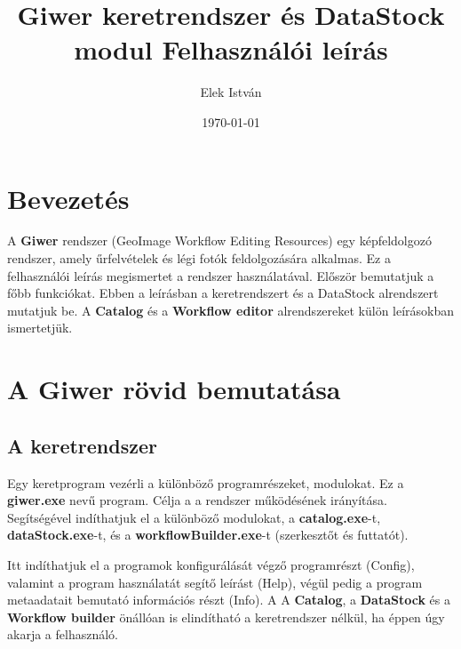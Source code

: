 \documentclass[a4paper,12pt]{article}
\begin{document}
\author{Elek István}

\title{ Giwer keretrendszer és DataStock modul  \linebreak  \linebreak \small Felhasználói leírás \linebreak \linebreak}


\date{\today}


\setcounter{tocdepth}{3}
\maketitle
\newpage
\tableofcontents
\newpage


\section{Bevezetés}

A \textbf{Giwer} rendszer (GeoImage Workflow Editing Resources) egy képfeldolgozó rendszer, amely űrfelvételek és légi fotók feldolgozására alkalmas. Ez a felhasználói leírás megismertet a rendszer használatával. Először bemutatjuk a főbb funkciókat. Ebben a leírásban a keretrendszert és a DataStock alrendszert mutatjuk be. A \textbf{Catalog} és a \textbf{Workflow editor} alrendszereket külön leírásokban ismertetjük.

\section{A Giwer rövid bemutatása}

\subsection{A keretrendszer}

Egy keretprogram vezérli a különböző programrészeket, modulokat. Ez a \textbf{giwer.exe} nevű program. Célja a a rendszer működésének irányítása. Segítségével indíthatjuk el a különböző modulokat, a \textbf{catalog.exe}-t, \textbf{dataStock.exe}-t, és a \textbf{workflowBuilder.exe}-t (szerkesztőt és futtatót). 

Itt indíthatjuk el a programok konfigurálását végző programrészt (Config), valamint a program használatát segítő leírást (Help), végül pedig a program metaadatait bemutató információs részt (Info).
A A \textbf{Catalog}, a \textbf{DataStock} és a \textbf{Workflow builder} önállóan is elindítható a keretrendszer nélkül, ha éppen úgy akarja a felhasználó.
\end{document}
